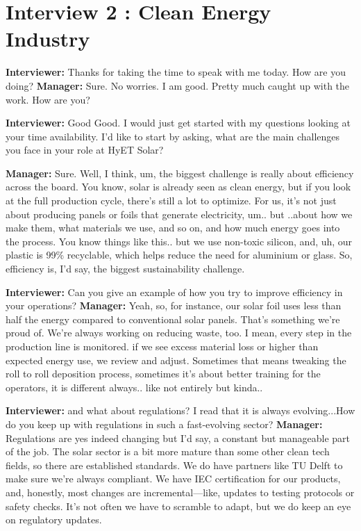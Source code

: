 \section{Interview 2 : Clean Energy Industry}
\textbf{Interviewer:} Thanks for taking the time to speak with me today. How are you doing? \newline
\textbf{Manager:} Sure. No worries. I am good. Pretty much caught up with the work. How are you? \newline

\textbf{Interviewer:} Good Good. I would just get started with my questions looking at your time availability. I'd like to start by asking, what are the main challenges you face in your role at HyET Solar? \newline

\textbf{Manager:} Sure. Well, I think, um, the biggest challenge is really about efficiency across the board. You know, solar is already seen as clean energy, but if you look at the full production cycle, there's still a lot to optimize. For us, it's not just about producing panels or foils that generate electricity, um.. but ..about how we make them, what materials we use, and so on,  and how much energy goes into the process. You know things like this.. but we use non-toxic silicon, and, uh, our plastic is 99\% recyclable, which helps reduce the need for aluminium or glass. So, efficiency is, I'd say, the biggest sustainability challenge. \newline

\textbf{Interviewer:} Can you give an example of how you try to improve efficiency in your operations? \newline
\textbf{Manager:} Yeah, so, for instance, our solar foil uses less than half the energy compared to conventional solar panels. That's something we're proud of. We're always working on reducing waste, too. I mean, every step in the production line is monitored. if we see excess material loss or higher than expected energy use, we review and adjust. Sometimes that means tweaking the roll to roll deposition process, sometimes it's about better training for the operators, it is different always.. like not entirely but kinda.. \newline

\textbf{Interviewer:} and what about regulations? I read that it is always evolving...How do you keep up with regulations in such a fast-evolving sector? \newline
\textbf{Manager:} Regulations are yes indeed changing but I'd say, a constant but manageable part of the job. The solar sector is a bit more mature than some other clean tech fields, so there are established standards. We do have partners like TU Delft to make sure we're always compliant. We have IEC certification for our products, and, honestly, most changes are incremental—like, updates to testing protocols or safety checks. It's not often we have to scramble to adapt, but we do keep an eye on regulatory updates. \newline

